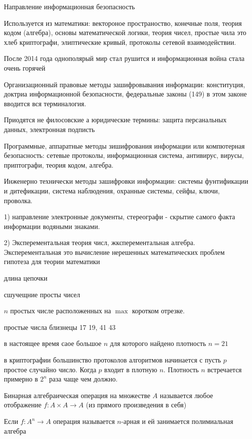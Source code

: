 \begin{title}[\large]
  Направление информационная безопасность
\end{title}

Используется из математики: вектороное пространоство, конечные поля, теория
кодом (алгебра), основы математической логики, теория чисел, простые чила это
хлеб криптографи, элиптические кривый, протоколы сетевой взаимодействии.

После 2014 года однополярый мир стал рушится и информационная война стала очень
горячей

Организационный правовые методы зашифровывания информации: конституция,
доктриа информационной безопасности, федеральные законы (149) в этом законе
вводится вся терминалогия.

Приодятся не филосовские а юридические термины: защита персанальных данных,
электронная подписть

Программные, аппаратные методы зишифрования информации или компютерная
безопасность: сетевые протоколы, информационная система, антивирус, вирусы,
приптографи, теория кодом, алгебра.

Инженерно технически методы зашифровки информации: системы фунтификации и
дитефикации, система наблюдения, охранные системы, сейфы, ключи, проволка.

1) направление электронные документы, стереографи - скрытие самого факта
информации водяными знаками.

2) Эксперементальная теория числ, жксперементальная алгебра. Эксперементальная
это вычисление нерешенных математических проблем гипотеза для теории математики

длина цепочки

сшучещние просты чисел

$n$ простых числе расположенных на $\max$ коротком отрезке.

простые числа близнецы 17 19, 41 43

в настоящее время саое большое $n$ для которого найдено плотность $n = 21$

в криптографии большинство протоколов алгоритмов начинается с пусть $p$
простое случайно число. Когда $p$ входит в плотную $n$. Плотность $n$
встречается примерно в $2^n$ раза чаще чем должно.

Бинарная алгебраическая операция на множестве $A$ называется любое отображение
$f:A\times A \to A$ (из прямого произведения в себя)

Если $f: A^n \to A$ операция называется $n$-арная и ей занимается полимиальная
алгебра


